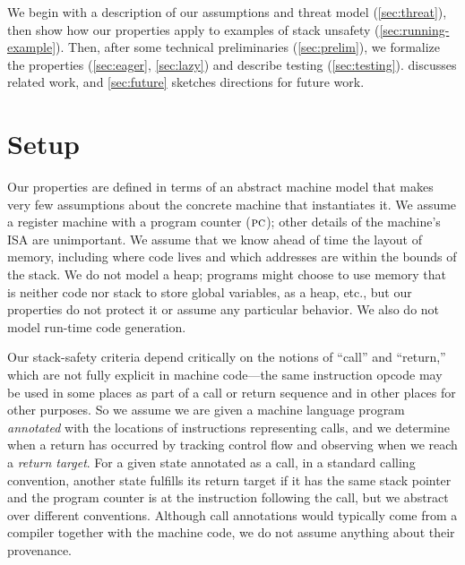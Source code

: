 \documentclass[acmsmall,review,anonymous]{acmart}\settopmatter{printfolios=true,printccs=false,printacmref=false}
\begin{document}
We begin with a description of our assumptions and threat model (\cref{sec:threat}),
then show how our properties apply to examples of stack unsafety
(\cref{sec:running-example}). Then, after some technical preliminaries
(\cref{sec:prelim}), we formalize the properties (\cref{sec:eager}, \cref{sec:lazy})
and describe testing (\cref{sec:testing}).
 discusses related work, and
\cref{sec:future} sketches directions for future work.

\section{Setup}
\label{sec:setup}

Our properties are defined in terms of an abstract machine model that makes very few
assumptions about the concrete machine that instantiates it.  We assume a register
machine with a program counter (\(\textsc{pc}\)); other
details of the machine's ISA are unimportant. We assume that we know ahead of time
the layout of memory, including where code lives and which addresses are within
the bounds of the stack. We do not model a heap; programs might choose to use memory
that is neither code nor stack to store global variables, as a heap, etc., but our
properties do not protect it or assume any particular behavior. We also do not
model run-time code generation.

Our stack-safety criteria depend
critically on the notions of ``call'' and ``return,'' which are not fully explicit
in machine code---the same instruction opcode may be used in some places as part of
a call or return sequence and in other places for other purposes.
%
So we assume we are given a machine language program {\em annotated} with the locations of
instructions representing calls, and we determine when a return has occurred by tracking
control flow and observing when we reach a {\em return target}. For a given state annotated
as a call, in a standard calling convention, another state fulfills its return target if
it has the same stack pointer and the program counter is at the instruction following
the call, but we abstract over different conventions.
Although call annotations would typically come from a compiler together with
the machine code, we do not assume anything about their provenance.
\end{document}
